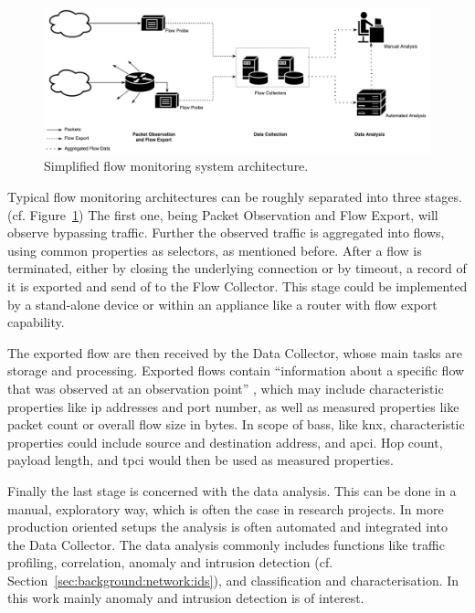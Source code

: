 \newpage
\begin{figure}[h]
	\centering
	\includegraphics[width=\textwidth]{figures/200-netflow-architecture.pdf}
	\caption[Simplified flow monitoring system architecture]{Simplified flow monitoring system architecture. \parencite[cf.][]{Hofstede2014} }
	\label{fig:background:network:netflow:architecture}
\end{figure}

Typical flow monitoring architectures can be roughly separated into three stages. (cf. Figure~\ref{fig:background:network:netflow:architecture})
The first one, being Packet Observation and Flow Export, will observe bypassing traffic. Further the observed traffic is aggregated into flows, using common properties as selectors, as mentioned before.
After a flow is terminated, either by closing the underlying connection or by timeout, a record of it is exported and send of to the Flow Collector.
This stage could be implemented by a stand-alone device or within an appliance like a router with flow export capability. \parencite{Hofstede2014}

The exported flow are then received by the Data Collector, whose main tasks are storage and processing.
Exported flows contain \enquote{information about a specific flow that was observed at an observation point} \parencite{Claise2013}, which may include characteristic properties like \gls{ip} addresses and port number, as well as measured properties like packet count or overall flow size in bytes. \parencite{Hofstede2014}
In scope of \glspl{bas}, like \gls{knx}, characteristic properties could include source and destination address, and \gls{apci}. Hop count, payload length, and \gls{tpci} would then be used as measured properties.

Finally the last stage is concerned with the data analysis. This can be done in a manual, exploratory way, which is often the case in research projects. In more production oriented setups the analysis is often automated and integrated into the Data Collector.
The data analysis commonly includes functions like traffic profiling, correlation, anomaly and intrusion detection (cf. Section~\ref{sec:background:network:ids}), and classification and characterisation. \parencite[cf.][]{Hofstede2014}
In this work mainly anomaly and intrusion detection is of interest.

